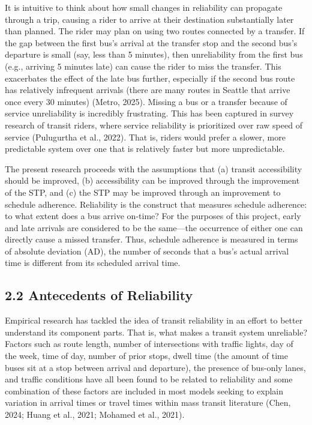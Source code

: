 \documentclass[
  12pt,
]{article}
\begin{document}
It is intuitive to think about how small changes in reliability can
propagate through a trip, causing a rider to arrive at their destination
substantially later than planned. The rider may plan on using two routes
connected by a transfer. If the gap between the first bus's arrival at
the transfer stop and the second bus's departure is small (say, less
than 5 minutes), then unreliability from the first bus (e.g., arriving 5
minutes late) can cause the rider to miss the transfer. This exacerbates
the effect of the late bus further, especially if the second bus route
has relatively infrequent arrivals (there are many routes in Seattle
that arrive once every 30 minutes) (Metro, 2025). Missing a bus or a
transfer because of service unreliability is incredibly frustrating.
This has been captured in survey research of transit riders, where
service reliability is prioritized over raw speed of service (Pulugurtha
et al., 2022). That is, riders would prefer a slower, more predictable
system over one that is relatively faster but more unpredictable.

The present research proceeds with the assumptions that (a) transit
accessibility should be improved, (b) accessibility can be improved
through the improvement of the STP, and (c) the STP may be improved
through an improvement to schedule adherence. Reliability is the
construct that measures schedule adherence: to what extent does a bus
arrive on-time? For the purposes of this project, early and late
arrivals are considered to be the same---the occurrence of either one
can directly cause a missed transfer. Thus, schedule adherence is
measured in terms of absolute deviation (AD), the number of seconds that
a bus's actual arrival time is different from its scheduled arrival
time.

\subsection{2.2 Antecedents of
Reliability}\label{antecedents-of-reliability}

Empirical research has tackled the idea of transit reliability in an
effort to better understand its component parts. That is, what makes a
transit system unreliable? Factors such as route length, number of
intersections with traffic lights, day of the week, time of day, number
of prior stops, dwell time (the amount of time buses sit at a stop
between arrival and departure), the presence of bus-only lanes, and
traffic conditions have all been found to be related to reliability and
some combination of these factors are included in most models seeking to
explain variation in arrival times or travel times within mass transit
literature (Chen, 2024; Huang et al., 2021; Mohamed et al., 2021).
\end{document}
